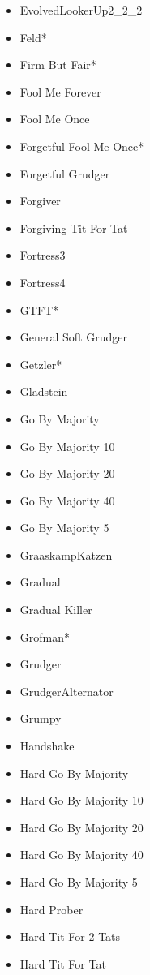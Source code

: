 \begin{appendices}
\begin{multicols}{4}
\begin{itemize}
            \item EvolvedLookerUp2\_2\_2
            \item Feld*
            \item Firm But Fair*
            \item Fool Me Forever
            \item Fool Me Once
            \item Forgetful Fool Me Once*
            \item Forgetful Grudger
            \item Forgiver
            \item Forgiving Tit For Tat
            \item Fortress3
            \item Fortress4
            \item GTFT*
            \item General Soft Grudger
            \item Getzler*
            \item Gladstein
            \item Go By Majority
            \item Go By Majority 10
            \item Go By Majority 20
            \item Go By Majority 40
            \item Go By Majority 5
            \item GraaskampKatzen
            \item Gradual
            \item Gradual Killer
            \item Grofman*
            \item Grudger
            \item GrudgerAlternator
            \item Grumpy
            \item Handshake
            \item Hard Go By Majority
            \item Hard Go By Majority 10
            \item Hard Go By Majority 20
            \item Hard Go By Majority 40
            \item Hard Go By Majority 5
            \item Hard Prober
            \item Hard Tit For 2 Tats
            \item Hard Tit For Tat

\end{itemize}
\end{multicols}
\end{appendices}
